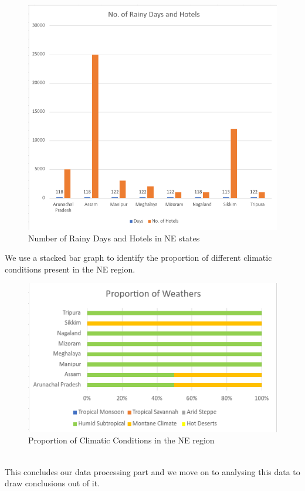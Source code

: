 \documentclass{report}
\begin{document}
\begin{Center}
  \begin{figure}[h!]
    \includegraphics[width=1\textwidth]{NEColumnBar.png}
    \caption{Number of Rainy Days and Hotels in NE states}
   \end{figure}
 \end{Center}
\newpage
 We use a stacked bar graph to identify the proportion of different climatic conditions present in the NE region.
\begin{Center}
  \begin{figure}[h!]
    \includegraphics[width=1\textwidth]{NEWeatherBar.png}
    \caption{Proportion of Climatic Conditions in the NE region}
   \end{figure}
 \end{Center}
 \\ This concludes our data processing part and we move on to analysing this data to draw conclusions out of it.
\end{document}
